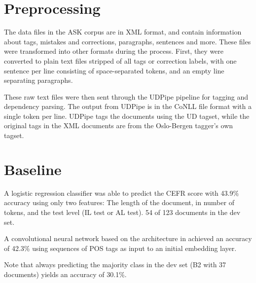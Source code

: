 
\section{Preprocessing}

The data files in the ASK corpus are in XML format, and contain information
about tags, mistakes and corrections, paragraphs, sentences and more. These
files were transformed into other formats during the process. First, they
were converted to plain text files stripped of all tags or correction labels,
with one sentence per line consisting of space-separated tokens, and an empty
line separating paragraphs.

These raw text files were then sent through the UDPipe pipeline for tagging
and dependency parsing. The output from UDPipe is in the CoNLL file format
with a single token per line. UDPipe tags the documents using the UD tagset,
while the original tags in the XML documents are from the Oslo-Bergen
tagger's own tagset.

\section{Baseline}

A logistic regression classifier was able to predict the CEFR score with
43.9\% accuracy using only two features: The length of the document, in
number of tokens, and the test level (IL test or AL test). 54 of 123
documents in the dev set.

A convolutional neural network based on the architecture in
\textcite{zhang2017sensitivity} achieved an accuracy of 42.3\% using
sequences of POS tags as input to an initial embedding layer.

Note that always predicting the majority class in the dev set (B2 with 37
documents) yields an accuracy of 30.1\%.
